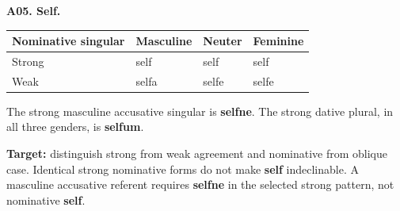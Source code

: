 \par\begin{minipage}{\linewidth}\raggedright
\textbf{A05. Self.}

\par\begingroup
\fontsize{10.5}{13.2}\selectfont
\setlength{\LTleft}{0pt}\setlength{\LTright}{\fill}
\noindent
\begin{tabular}{@{}>{\raggedright\arraybackslash}p{36.86mm}>{\raggedright\arraybackslash}p{26.23mm}>{\raggedright\arraybackslash}p{26.23mm}>{\raggedright\arraybackslash}p{26.23mm}@{}}
\toprule
\textbf{Nominative singular} & \textbf{Masculine} & \textbf{Neuter} & \textbf{Feminine} \\
\midrule
Strong & self & self & self \\
Weak & selfa & selfe & selfe \\
\bottomrule
\end{tabular}
\par\endgroup

The strong masculine accusative singular is \textbf{selfne}. The strong dative plural, in all three genders, is \textbf{selfum}.

\textbf{Target:} distinguish strong from weak agreement and nominative from oblique case. Identical strong nominative forms do not make \textbf{self} indeclinable. A masculine accusative referent requires \textbf{selfne} in the selected strong pattern, not nominative \textbf{self}.

\end{minipage}\par\addvspace{4pt}

